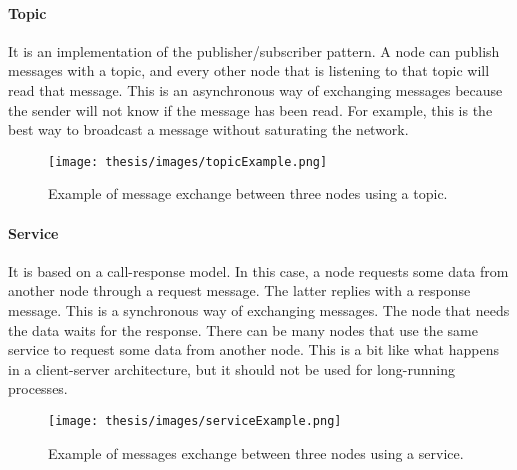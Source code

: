 \documentclass[../thesis.tex]{subfiles}
\begin{document}
\paragraph{Topic}
It is an implementation of the publisher/subscriber pattern. A node can publish messages with a topic, and every other node that is listening to that topic will read that message. This is an asynchronous way of exchanging messages because the sender will not know if the message has been read. For example, this is the best way to broadcast a message without saturating the network. 
\begin{figure}[H]
    \centering
    \texttt{[image: thesis/images/topicExample.png]}
    \caption{Example of message exchange between three nodes using a topic.}
    \label{fig:exampleTopicExchangeMessage}
\end{figure}

\paragraph{Service}
It is based on a call-response model. In this case, a node requests some data from another node through a request message. The latter replies with a response message. This is a synchronous way of exchanging messages. The node that needs the data waits for the response. There can be many nodes that use the same service to request some data from another node. This is a bit like what happens in a client-server architecture, but it should not be used for long-running processes. 
\begin{figure}[H]
    \centering
    \texttt{[image: thesis/images/serviceExample.png]}
    \caption{Example of messages exchange between three nodes using a service.}
    \label{fig:exampleServiceExchangeMessage}
\end{figure}
\end{document}

